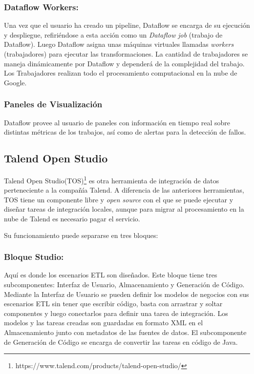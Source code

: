 \subsubsection{Dataflow Workers:}

Una vez que el usuario ha creado un pipeline, Dataflow se encarga de su ejecución y despliegue, refiriéndose a esta 
acción como un \emph{Dataflow job} (trabajo de Dataflow). Luego Dataflow asigna unas máquinas virtuales llamadas \emph{workers} 
(trabajadores) para ejecutar las transformaciones. La cantidad de trabajadores se maneja din\'amicamente por Dataflow 
y depender\'a de la complejidad del trabajo. Los Trabajadores realizan todo el procesamiento computacional en la nube 
de Google.

\subsubsection{Paneles de Visualizaci\'on}

Dataflow provee al usuario de paneles con información en tiempo real sobre distintas métricas de los trabajos, as\'i 
como de alertas para la detección de fallos.





\subsection{Talend Open Studio}

Talend Open Studio(TOS)\footnote{https://www.talend.com/products/talend-open-studio/} es otra herramienta de 
integración de datos perteneciente a la compañía Talend. A diferencia de las 
anteriores herramientas, TOS tiene un componente libre y \emph{open source} con el que se puede ejecutar y diseñar tareas de 
integración locales, aunque para migrar al procesamiento en la nube de Talend es necesario pagar el servicio. 

Su funcionamiento puede separarse en 
tres bloques\cite{noauthor_what_nodate}: 

\subsubsection{Bloque Studio:}

Aquí es donde los escenarios ETL son diseñados. Este bloque tiene tres subcomponentes: Interfaz de Usuario, Almacenamiento
y Generación de Código. Mediante la Interfaz de Usuario se pueden definir los modelos de negocios con sus escenarios ETL 
sin tener que escribir código, basta con arrastrar y soltar componentes y luego conectarlos para definir una tarea de 
integración. Los modelos y las tareas creadas son guardadas en formato XML en el Almacenamiento junto con metadatos 
de las fuentes de datos. El subcomponente de Generaci\'on de C\'odigo se encarga de convertir las tareas en c\'odigo de 
Java. 

